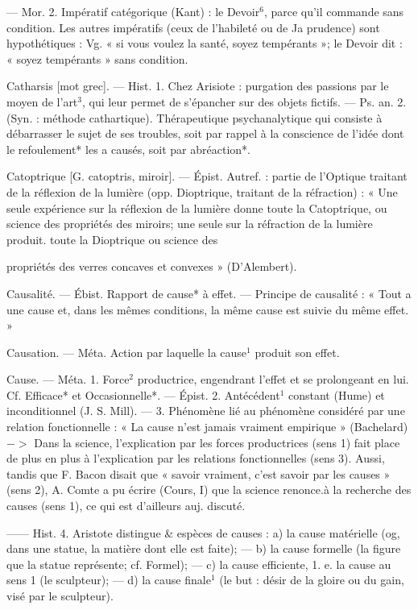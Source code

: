 — Mor. 2. Impératif catégorique
(Kant) : le Devoir$^6$, parce qu'il
commande sans condition. Les
autres impératifs (ceux de l’habileté
ou de Ja prudence) sont hypothétiques : Vg. « si vous voulez la santé,
soyez tempérants »; le Devoir dit :
« soyez tempérants » sans condition.

Catharsis [mot grec]. — Hist. 1. Chez
Arisiote : purgation des passions par
le moyen de l’art$^3$, qui leur permet
de s’épancher sur des objets fictifs.
— Ps. an. 2. (Syn. : méthode cathartique). Thérapeutique psychanalytique qui consiste à débarrasser le
sujet de ses troubles, soit par rappel
à la conscience de l’idée dont le
refoulement* les a causés, soit par
abréaction*.

Catoptrique [G. catoptris, miroir]. —
Épist. Autref. : partie de l'Optique
traitant de la réflexion de la lumière
(opp. Dioptrique, traitant de la
réfraction) : « Une seule expérience
sur la réflexion de la lumière donne
toute la Catoptrique, ou science des
propriétés des miroirs; une seule sur
la réfraction de la lumière produit.
toute la Dioptrique ou science des

propriétés des verres concaves et
convexes » (D’Alembert).

Causalité. — Ébist. Rapport de cause*
à effet. — Principe de causalité :
« Tout a une cause et, dans les
mêmes conditions, la même cause
est suivie du même effet. »

Causation. — Méta. Action par laquelle la cause$^1$ produit son effet.

Cause. — Méta. 1. Force$^2$ productrice,
engendrant l'effet et se prolongeant
en lui. Cf. Efficace* et Occasionnelle*. — Épist. 2. Antécédent$^1$
constant (Hume) et inconditionnel
(J. S. Mill). — 3. Phénomène lié au
phénomène considéré par une relation fonctionnelle : « La cause n’est
jamais vraiment empirique » (Bachelard) $->$ Dans la science, l'explication par les forces productrices
(sens 1) fait place de plus en plus à
l’explication par les relations fonctionnelles (sens 3). Aussi, tandis
que F. Bacon disait que « savoir
vraiment, c’est savoir par les causes »
(sens 2), A. Comte a pu écrire
(Cours, I) que la science renonce.à
la recherche des causes (sens 1), ce
qui est d'ailleurs auj. discuté.

—— Hist. 4. Aristote distingue
& espèces de causes : a) la cause matérielle (og, dans une statue, la
matière dont elle est faite); — b) la
cause formelle (la figure que la statue
représente; cf. Formel); — c) la
cause efficiente, 1. e. la cause au sens 1
(le sculpteur); — d) la cause finale$^1$
(le but : désir de la gloire ou du gain,
visé par le sculpteur).

